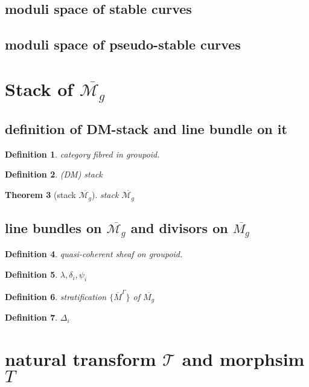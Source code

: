 \documentclass{article}
\newtheorem{defn}{Definition}[section]
\newtheorem{thm}[defn]{Theorem}
\begin{document}
\subsection{moduli space of stable curves}

\subsection{moduli space of pseudo-stable curves}

\section{Stack of $ \overline{\mathcal{M}_{g}}$}

\subsection{definition of DM-stack and line bundle on it}
\begin{defn}
	category fibred in groupoid.
\end{defn}
\begin{defn}
	(DM) stack
\end{defn}
\begin{thm}[stack $ \overline{\mathcal{M}_{g}}$]
	stack $ \overline{\mathcal{M}_{g}}$
\end{thm}

\subsection{line bundles on $ \overline{\mathcal{M}_{g}}$ and divisors on $ \overline{M_{g}}$}
\begin{defn}
	quasi-coherent sheaf on groupoid.
\end{defn}

\begin{defn}
	$\lambda, \delta_{i}, \psi_{i}$
\end{defn}


\begin{defn}
	stratification $ \{ \overline{M}^{\Gamma} \} $ of $ \overline{M_{g}}$
\end{defn}

\begin{defn}
	$ \Delta_{i}$
\end{defn}

\section{natural transform $\mathcal{T}$ and morphsim $T$}
\end{document}
